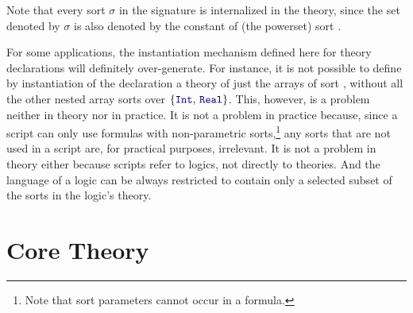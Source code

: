 %
Note that every sort $\sigma$ in the signature is internalized in the theory, 
since the set denoted by $\sigma$ is also denoted 
by the constant  of (the powerset) sort .


\smallskip
\begin{remark}
For some applications, 
the instantiation mechanism defined here for theory declarations
will definitely over-generate.
For instance, it is not possible to define by instantiation of
the  declaration 
a theory of just the arrays of sort ,
without all the other nested array sorts over $\{\ter{Int},\, \ter{Real}\}$.
This, however, is a problem neither in theory nor in practice. 
It is not a problem in practice because,
since a script can only use formulas with non-parametric sorts,\footnote{%
Note that sort parameters cannot occur in a formula.
}
any sorts that are not used in a script are, for practical purposes,
irrelevant. 
It is not a problem in theory either 
because scripts refer to logics, not directly to theories.
And the language of a logic can be always restricted to contain only
a selected subset of the sorts in the logic's theory.
\end{remark}


\section{Core Theory}
\label{sec:core}


